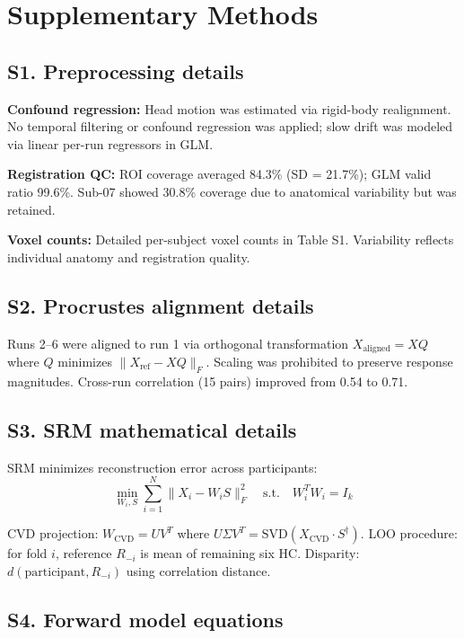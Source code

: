 \section*{Supplementary Methods}

\subsection*{S1. Preprocessing details}

\textbf{Confound regression:} Head motion was estimated via rigid-body realignment. No temporal filtering or confound regression was applied; slow drift was modeled via linear per-run regressors in GLM.

\textbf{Registration QC:} ROI coverage averaged 84.3\% (SD = 21.7\%); GLM valid ratio 99.6\%. Sub-07 showed 30.8\% coverage due to anatomical variability but was retained.

\textbf{Voxel counts:} Detailed per-subject voxel counts in Table S1. Variability reflects individual anatomy and registration quality.

\subsection*{S2. Procrustes alignment details}

Runs 2--6 were aligned to run 1 via orthogonal transformation $X_{\text{aligned}} = XQ$ where $Q$ minimizes $\|X_{\text{ref}} - XQ\|_F$. Scaling was prohibited to preserve response magnitudes. Cross-run correlation (15 pairs) improved from 0.54 to 0.71.

\subsection*{S3. SRM mathematical details}

SRM minimizes reconstruction error across participants:
\begin{equation}
\min_{W_i, S} \sum_{i=1}^N \|X_i - W_i S\|_F^2 \quad \text{s.t.} \quad W_i^T W_i = I_k
\end{equation}

CVD projection: $W_{\text{CVD}} = U V^T$ where $U \Sigma V^T = \text{SVD}(X_{\text{CVD}} \cdot S^\dagger)$. LOO procedure: for fold $i$, reference $R_{-i}$ is mean of remaining six HC. Disparity: $d(\text{participant}, R_{-i})$ using correlation distance.

\subsection*{S4. Forward model equations}

